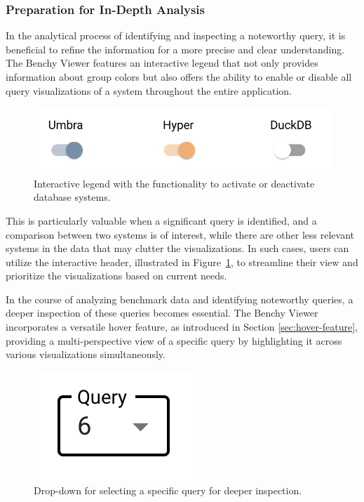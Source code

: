 \subsubsection{Preparation for In-Depth Analysis}

In the analytical process of identifying and inspecting a noteworthy query, it is beneficial to refine the information for a more precise and clear understanding.\\
The Benchy Viewer features an interactive legend that not only provides information about group colors but also offers the ability to enable or disable all query visualizations of a system throughout the entire application.

\begin{figure}[h]
  \centering
  \includegraphics[width=0.4\linewidth]{figures/legend-activate-deactivate.png}
  \caption{Interactive legend with the functionality to activate or deactivate database systems.}
  \label{fig:legend-activate-deactivate}
\end{figure}

This is particularly valuable when a significant query is identified, and a comparison between two systems is of interest, while there are other less relevant systems in the data that may clutter the visualizations. In such cases, users can utilize the interactive header, illustrated in Figure~\ref{fig:legend-activate-deactivate}, to streamline their view and prioritize the visualizations based on current needs.

In the course of analyzing benchmark data and identifying noteworthy queries, a deeper inspection of these queries becomes essential. The Benchy Viewer incorporates a versatile hover feature, as introduced in Section \ref{sec:hover-feature}, providing a multi-perspective view of a specific query by highlighting it across various visualizations simultaneously.

\begin{figure}[h]
  \centering
  \includegraphics[width=0.15\linewidth]{figures/select-query.png}
  \caption{Drop-down for selecting a specific query for deeper inspection.}
  \label{fig:select-query}
\end{figure}

